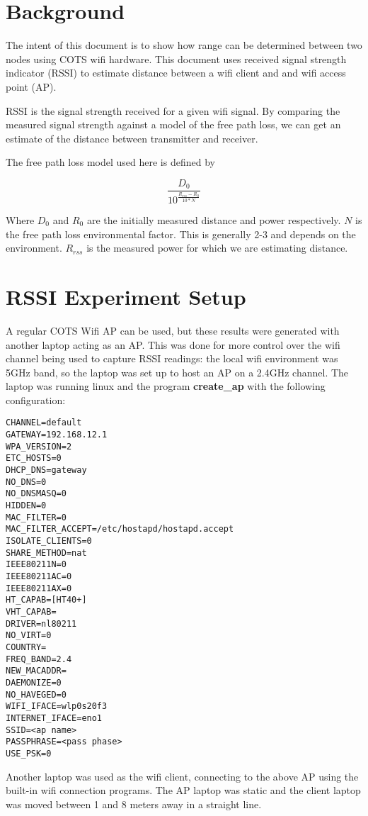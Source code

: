\documentclass[10pt,letterpaper]{article}
\begin{document}
\section{Background}
The intent of this document is to show how range can be determined
between two nodes using COTS wifi hardware. This document uses
received signal strength indicator (RSSI) to estimate distance between
a wifi client and and wifi access point (AP).

RSSI is the signal strength received for a given wifi signal. By
comparing the measured signal strength against a model of the free
path loss, we can get an estimate of the distance between transmitter
and receiver.

The free path loss model used here is defined by

\[ \frac{D_0}{10^{\frac{R_{rss} - R_0}{10 * N}}} \]

Where $D_0$ and $R_0$ are the initially measured distance and power
respectively. $N$ is the free path loss environmental factor. This is
generally 2-3 and depends on the environment. $R_{rss}$ is the
measured power for which we are estimating distance.

\section{RSSI Experiment Setup}
A regular COTS Wifi AP can be used, but these results were generated
with another laptop acting as an AP. This was done for more control
over the wifi channel being used to capture RSSI readings: the local
wifi environment was 5GHz band, so the laptop was set up to host an AP
on a 2.4GHz channel. The laptop was running linux and the program
\textbf{create\_ap} with the following configuration:

\begin{verbatim}
CHANNEL=default
GATEWAY=192.168.12.1
WPA_VERSION=2
ETC_HOSTS=0
DHCP_DNS=gateway
NO_DNS=0
NO_DNSMASQ=0
HIDDEN=0
MAC_FILTER=0
MAC_FILTER_ACCEPT=/etc/hostapd/hostapd.accept
ISOLATE_CLIENTS=0
SHARE_METHOD=nat
IEEE80211N=0
IEEE80211AC=0
IEEE80211AX=0
HT_CAPAB=[HT40+]
VHT_CAPAB=
DRIVER=nl80211
NO_VIRT=0
COUNTRY=
FREQ_BAND=2.4
NEW_MACADDR=
DAEMONIZE=0
NO_HAVEGED=0
WIFI_IFACE=wlp0s20f3
INTERNET_IFACE=eno1
SSID=<ap name>
PASSPHRASE=<pass phase>
USE_PSK=0
\end{verbatim}

Another laptop was used as the wifi client, connecting to the above AP
using the built-in wifi connection programs.  The AP laptop was static
and the client laptop was moved between 1 and 8 meters away in a
straight line.
\end{document}
